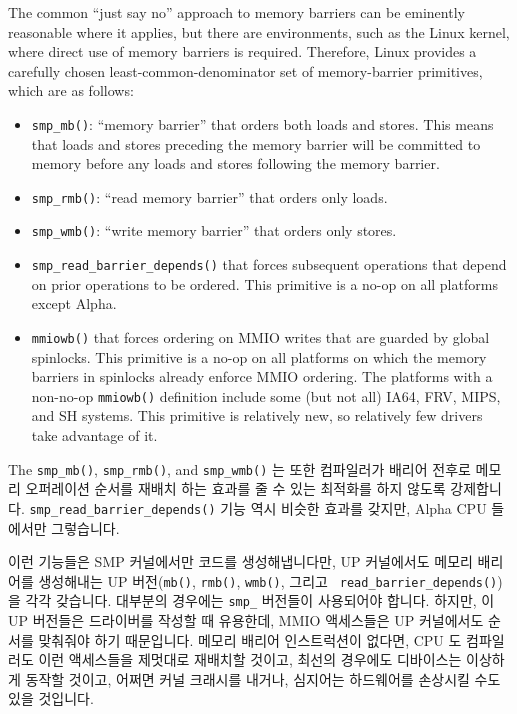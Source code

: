The common ``just say no'' approach to memory barriers
can be eminently reasonable where it applies,
but there are environments, such as the Linux kernel, where direct
use of memory barriers is required.
Therefore,
Linux provides a carefully chosen least-common-denominator
set of memory-barrier primitives, which are as follows:
\begin{itemize}
\item	{\tt smp\_mb()}: ``memory barrier'' that orders both loads and
	stores.
	This means that loads and stores preceding the memory barrier
	will be committed to memory before any loads and stores
	following the memory barrier.
\item	{\tt smp\_rmb()}: ``read memory barrier'' that orders only loads.
\item	{\tt smp\_wmb()}: ``write memory barrier'' that orders only stores.
\item	{\tt smp\_read\_barrier\_depends()} that forces subsequent operations
	that depend on prior operations to be ordered.
	This primitive is a no-op on all platforms except Alpha.
\item	{\tt mmiowb()} that forces ordering on MMIO writes that are guarded
	by global spinlocks.
	This primitive is a no-op on all platforms on which the memory
	barriers in spinlocks already enforce MMIO ordering.
	The platforms with a non-no-op {\tt mmiowb()} definition include
	some (but not all) IA64, FRV, MIPS, and SH systems.
	This primitive is relatively new, so relatively few drivers take
	advantage of it.
\end{itemize}
\fi
The {\tt smp\_mb()}, {\tt smp\_rmb()}, and {\tt smp\_wmb()} 는 또한 컴파일러가
배리어 전후로 메모리 오퍼레이션 순서를 재배치 하는 효과를 줄 수 있는 최적화를
하지 않도록 강제합니다.
{\tt smp\_read\_barrier\_depends()} 기능 역시 비슷한 효과를 갖지만, Alpha CPU
들에서만 그렇습니다.

이런 기능들은 SMP 커널에서만 코드를 생성해냅니다만, UP 커널에서도 메모리
배리어를 생성해내는 UP 버전({\tt mb()}, {\tt rmb()}, {\tt wmb()}, 그리고 {\tt
read\_barrier\_depends()})을 각각 갖습니다.
대부분의 경우에는 {\tt smp\_} 버전들이 사용되어야 합니다.
하지만, 이 UP 버전들은 드라이버를 작성할 때 유용한데, MMIO 액세스들은 UP
커널에서도 순서를 맞춰줘야 하기 때문입니다.
메모리 배리어 인스트럭션이 없다면, CPU 도 컴파일러도 이런 액세스들을 제멋대로
재배치할 것이고, 최선의 경우에도 디바이스는 이상하게 동작할 것이고, 어쩌면 커널
크래시를 내거나, 심지어는 하드웨어를 손상시킬 수도 있을 것입니다.
\iffalse

